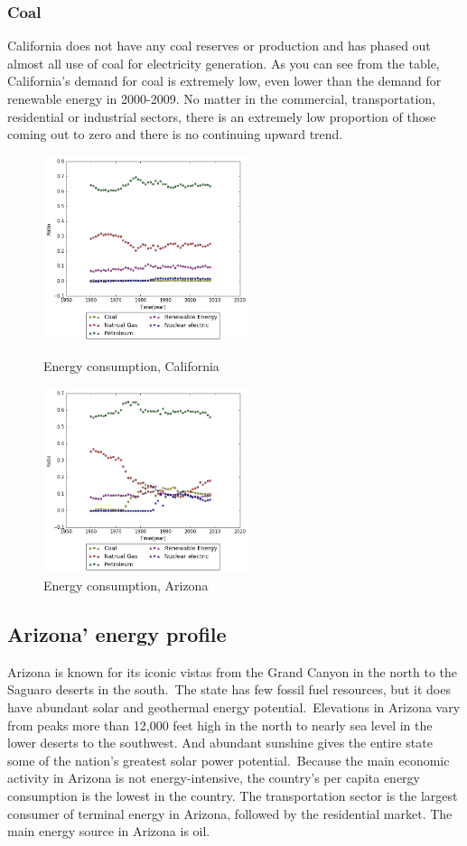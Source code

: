 \documentclass{mcmthesis}
\begin{document}
\subsubsection{Coal}
  California does not have any coal reserves or production and has phased out almost all use of coal for electricity generation. As you can see from the table, California's demand for coal is extremely low, even lower than the demand for renewable energy in 2000-2009. No matter in the commercial, transportation, residential or industrial sectors, there is an extremely low proportion of those coming out to zero and there is no continuing upward trend.
  \begin{figure}[htbp]
  \centering
  \begin{minipage}[t]{0.48\textwidth}
  \centering
  \includegraphics[width=6cm]{energyprofile_ca.png}
  \caption{Energy consumption, California}
  \end{minipage}
  \begin{minipage}[t]{0.48\textwidth}
  \centering
  \includegraphics[width=6cm]{energyprofile_az.png}
  \caption{Energy consumption, Arizona}
  \end{minipage}
  \end{figure}
\subsection{Arizona' energy profile}
Arizona is known for its iconic vistas from the Grand Canyon in the north to the Saguaro deserts in the south. The state has few fossil fuel resources, but it does have abundant solar and geothermal energy potential. Elevations in Arizona vary from peaks more than 12,000 feet high in the north to nearly sea level in the lower deserts to the southwest. And abundant sunshine gives the entire state some of the nation’s greatest solar power potential. Because the main economic activity in Arizona is not energy-intensive, the country's per capita energy consumption is the lowest in the country. The transportation sector is the largest consumer of terminal energy in Arizona, followed by the residential market. The main energy source in Arizona is oil.
\end{document}
